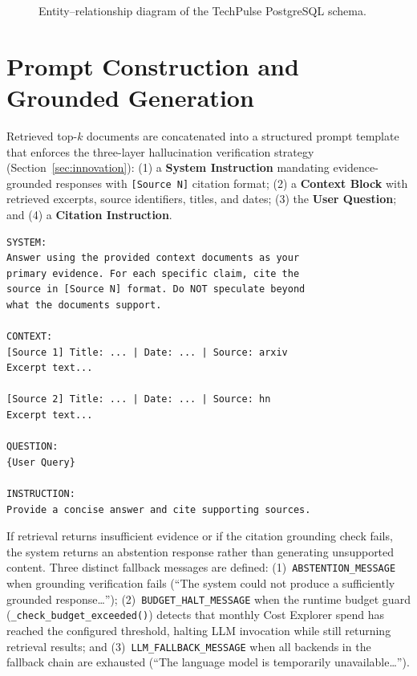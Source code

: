 \begin{figure}[H]
{%
}
\caption{Entity--relationship diagram of the TechPulse PostgreSQL schema.}
\label{fig:er_diagram}
\end{figure}

\section{Prompt Construction and Grounded Generation}
\label{sec:prompt_ch4}

Retrieved top-$k$ documents are concatenated into a structured prompt template that enforces the three-layer hallucination verification strategy (Section~\ref{sec:innovation}): (1) a \textbf{System Instruction} mandating evidence-grounded responses with \texttt{[Source N]} citation format; (2) a \textbf{Context Block} with retrieved excerpts, source identifiers, titles, and dates; (3) the \textbf{User Question}; and (4) a \textbf{Citation Instruction}.

\begin{lstlisting}[caption={Implemented Structured Generation Prompt Template.}, label={lst:prompt}]
SYSTEM:
Answer using the provided context documents as your
primary evidence. For each specific claim, cite the
source in [Source N] format. Do NOT speculate beyond
what the documents support.

CONTEXT:
[Source 1] Title: ... | Date: ... | Source: arxiv
Excerpt text...

[Source 2] Title: ... | Date: ... | Source: hn
Excerpt text...

QUESTION:
{User Query}

INSTRUCTION:
Provide a concise answer and cite supporting sources.
\end{lstlisting}

If retrieval returns insufficient evidence or if the citation grounding check fails, the system returns an abstention response rather than generating unsupported content. Three distinct fallback messages are defined: (1)~\texttt{ABSTENTION\_MESSAGE} when grounding verification fails (``The system could not produce a sufficiently grounded response\ldots''); (2)~\texttt{BUDGET\_HALT\_MESSAGE} when the runtime budget guard (\texttt{\_check\_budget\_exceeded()}) detects that monthly Cost Explorer spend has reached the configured threshold, halting LLM invocation while still returning retrieval results; and (3)~\texttt{LLM\_FALLBACK\_MESSAGE} when all backends in the fallback chain are exhausted (``The language model is temporarily unavailable\ldots'').

